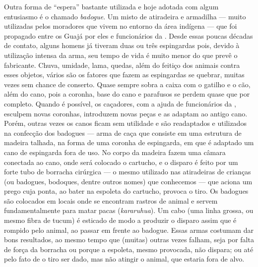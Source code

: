 Outra forma de ``espera'' bastante utilizada e hoje adotada com algum
entusiasmo é o chamado \emph{badogue}. Um misto de atiradeira e
armadilha --- muito utilizadas pelos moradores que vivem no entorno da
área indígena --- que foi propagado entre os Guajá por eles e funcionários
da . Desde essas poucas décadas de contato, alguns homens já
tiveram duas ou três espingardas pois, devido à utilização intensa da
arma, seu tempo de vida é muito menor do que prevê o fabricante. Chuva,
umidade, lama, quedas, além do feitiço dos animais contra esses objetos,
vários são os fatores que fazem as espingardas se quebrar, muitas vezes
sem chance de conserto. Quase sempre sobra a caixa com o gatilho e o
cão, além do cano, pois a coronha, base do cano e parafusos se perdem
quase que por completo. Quando é possível, os caçadores, com a ajuda de
funcionários da , esculpem novas coronhas, introduzem novas peças e
as adaptam ao antigo cano. Porém, outras vezes os canos ficam sem
utilidade e são readaptados e utilizados na confecção dos badogues ---
arma de caça que consiste em uma estrutura de madeira talhada, na forma
de uma coronha de espingarda, em que é adaptado um cano de espingarda
fora de uso. No corpo da madeira fazem uma câmara conectada ao cano,
onde será colocado o cartucho, e o disparo é feito por um forte tubo de
borracha cirúrgica --- o mesmo utilizado nas atiradeiras de crianças (ou
badogues, bodoques, dentre outros nomes) que conhecemos --- que aciona um
prego cuja ponta, ao bater na espoleta do cartucho, provoca o tiro. Os
badogues são colocados em locais onde se encontram rastros de animal e
servem fundamentalmente para matar pacas (\emph{kararuhua}). Um cabo
(uma linha grossa, ou mesmo fibra de tucum) é esticado de modo a
produzir o disparo assim que é rompido pelo animal, ao passar em frente
ao badogue. Essas armas costumam dar bons resultados, ao mesmo tempo que
(muitas) outras vezes falham, seja por falta de força da borracha ou
porque a espoleta, mesmo provocada, não dispara; ou até pelo fato de o
tiro ser dado, mas não atingir o animal, que estaria fora de alvo.

